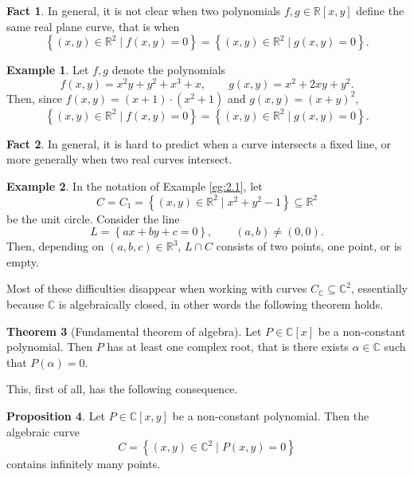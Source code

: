 \documentclass{article}
\newcommand{\R}{\mathbb{R}}
\newcommand{\C}{\mathbb{C}}
\newcommand{\rb}[1]{\left( #1 \right)}
\renewcommand{\sb}[1]{\left[ #1 \right]}
\newcommand{\cb}[1]{\left\{ #1 \right\}}
\theoremstyle{definition}\newtheorem{definition}{Definition}[section]
\theoremstyle{definition}\newtheorem{notation}[definition]{Notation}
\theoremstyle{definition}\newtheorem{remark}[definition]{Remark}
\theoremstyle{definition}\newtheorem{example1}[definition]{Example}
\theoremstyle{definition}\newtheorem{fact}{Fact}
\theoremstyle{definition}\newtheorem{exercise}{Exercise}
\theoremstyle{definition}\newtheorem*{example2}{Example}
\newtheorem{proposition}[definition]{Proposition}
\newtheorem{theorem}[definition]{Theorem}
\begin{document}
\begin{fact}
In general, it is not clear when two polynomials $ f, g \in \R\sb{x, y} $ define the same real plane curve, that is when
$$ \cb{\rb{x, y} \in \R^2 \mid f\rb{x, y} = 0} = \cb{\rb{x, y} \in \R^2 \mid g\rb{x, y} = 0}. $$
\end{fact}

\begin{example1}
\label{eg:2.2}
Let $ f, g $ denote the polynomials
$$ f\rb{x, y} = x^2y + y^2 + x^3 + x, \qquad g\rb{x, y} = x^2 + 2xy + y^2. $$
Then, since $ f\rb{x, y} = \rb{x + 1} \cdot \rb{x^2 + 1} $ and $ g\rb{x, y} = \rb{x + y}^2 $,
$$ \cb{\rb{x, y} \in \R^2 \mid f\rb{x, y} = 0} = \cb{\rb{x, y} \in \R^2 \mid g\rb{x, y} = 0}. $$
\end{example1}

\begin{fact}
In general, it is hard to predict when a curve intersects a fixed line, or more generally when two real curves intersect.
\end{fact}

\begin{example1}
In the notation of Example \ref{eg:2.1}, let
$$ C = C_1 = \cb{\rb{x, y} \in \R^2 \mid x^2 + y^2 - 1} \subseteq \R^2 $$
be the unit circle. Consider the line
$$ L = \cb{ax + by + c = 0}, \qquad \rb{a, b} \ne \rb{0, 0}. $$
Then, depending on $ \rb{a, b, c} \in \R^3 $, $ L \cap C $ consists of two points, one point, or is empty.
\end{example1}

Most of these difficulties disappear when working with curves $ C_\C \subseteq \C^2 $, essentially because $ \C $ is algebraically closed, in other words the following theorem holds.

\begin{theorem}[Fundamental theorem of algebra]
\label{thm:2.4}
Let $ P \in \C\sb{x} $ be a non-constant polynomial. Then $ P $ has at least one complex root, that is there exists $ \alpha \in \C $ such that $ P\rb{\alpha} = 0 $.
\end{theorem}

This, first of all, has the following consequence.

\begin{proposition}
Let $ P \in \C\sb{x, y} $ be a non-constant polynomial. Then the algebraic curve
$$ C = \cb{\rb{x, y} \in \C^2 \mid P\rb{x, y} = 0} $$
contains infinitely many points.
\end{proposition}
\end{document}
